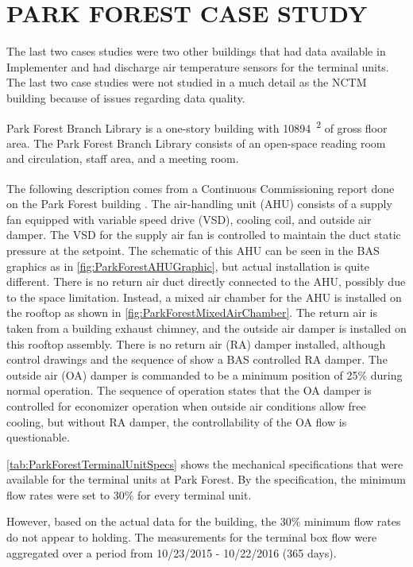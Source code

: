 \chapter{\texorpdfstring{\MakeUppercase{Park Forest Case Study}}{Park Forest Case Study}}

The last two cases studies were two other buildings that had data
available in Implementer and had discharge air temperature sensors for
the terminal units. The last two case studies were not studied in a much
detail as the NCTM building because of issues regarding data quality.

Park Forest Branch Library is a one-story building with
\SI{10894}{\feet\squared} of gross floor area. The Park Forest Branch
Library consists of an open-space reading room and circulation, staff
area, and a meeting room.

The following description comes from a Continuous
Commissioning\textsuperscript{\textregistered{}} report
done on the Park Forest building \cite{ParkForestReport}. The air-handling unit (AHU) consists
of a supply fan equipped with variable speed drive (VSD), cooling coil,
and outside air damper. The VSD for the supply air fan is controlled to
maintain the duct static pressure at the setpoint. The schematic of this AHU can
be seen in the BAS graphics as in \figref{}
\ref{fig:ParkForestAHUGraphic}, but actual installation is
quite different. There is no return air duct directly connected to the
AHU, possibly due to the space limitation. Instead, a mixed air chamber
for the AHU is installed on the rooftop as shown in \figref{}
\ref{fig:ParkForestMixedAirChamber}. The return
air is taken from a building exhaust chimney, and the outside air damper
is installed on this rooftop assembly. There is no return air (RA)
damper installed, although control drawings and the sequence of show a
BAS controlled RA damper. The outside air (OA) damper is commanded to be
a minimum position of 25\% during normal operation. The sequence of
operation states that the OA damper is controlled for economizer
operation when outside air conditions allow free cooling, but without
RA damper, the controllability of the OA flow is questionable.

\tableref{} \ref{tab:ParkForestTerminalUnitSpecs} shows the
mechanical specifications that were available for the terminal units at
Park Forest. By the specification, the minimum flow rates were set to
30\% for every terminal unit. 

However, based on the actual data for the building, the 30\% minimum
flow rates do not appear to holding. The measurements for the terminal
box flow were aggregated over a period from 10/23/2015 - 10/22/2016
(365 days). 

